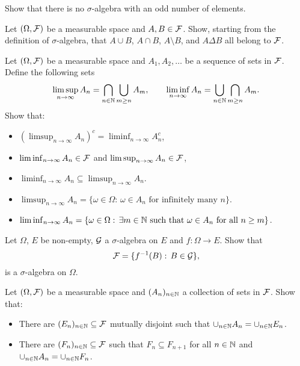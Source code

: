 
\begin{problem}
    Show that there is no $\sigma$-algebra with an odd number of elements.
\end{problem}

\begin{problem}
Let $(\Omega,\mathcal F)$ be a measurable space and $A,B\in \mathcal F$. Show, starting from the definition of $\sigma$-algebra, that $A\cup B$, $A\cap B$, $A\setminus B$, and $A\Delta B$ all belong to $\mathcal F$.
\end{problem}

\begin{problem}
    Let $(\Omega,\mathcal F)$ be a measurable space and $A_1, A_2,\ldots$ be a sequence of sets in $\mathcal F$. Define the following sets
    \begin{equation*}
        \limsup_{n\to\infty} A_n = \bigcap_{n\in \mathbb N} \bigcup_{m\geq n} A_m,\qquad \liminf_{n\to\infty} A_n = \bigcup_{n\in \mathbb N} \bigcap_{m\geq n} A_m.
    \end{equation*}
    Show that:
    \begin{itemize}
        \item $(\limsup_{n\to\infty} A_n)^c = \liminf_{n\to\infty} A_n^c$,
        \item $\liminf_{n\to\infty} A_n \in \mathcal F$ and $\limsup_{n\to\infty} A_n \in \mathcal F$,
        \item $\liminf_{n\to\infty} A_n \subseteq \limsup_{n\to\infty} A_n$.
        \item  $\limsup_{n\to\infty} A_n = \{\omega \in \Omega:\, \omega\in A_n\text{ for infinitely many $n$}\}$.
        \item $\liminf_{n\to\infty} A_n = \{\omega \in \Omega:\, \text{$\exists m\in \mathbb N$ such that $\omega\in A_n$ for all $n\geq m$}\}$.
    \end{itemize}
\end{problem}

\begin{problem}
    Let $\Omega$, $E$ be non-empty, $\mathcal G$ a $\sigma$-algebra on $E$ and $f:\Omega\to E$. Show that 
    \begin{equation*}
        \mathcal F = \{f^{-1}(B):\,B\in \mathcal G\},
    \end{equation*}
    is a $\sigma$-algebra on $\Omega$.
\end{problem}

\begin{problem}
    Let $(\Omega,\mathcal F)$ be a measurable space and $(A_n)_{n\in \mathbb N}$ a collection of sets in $\mathcal F$. Show that:
    \begin{itemize}
        \item There are $(E_n)_{n\in \mathbb N}\subseteq \mathcal F$ mutually disjoint such that $\cup_{n\in \mathbb N} A_n = \cup_{n\in \mathbb N} E_n$.
        \item There are $(F_n)_{n\in \mathbb N}\subseteq \mathcal F$ such that $F_n\subseteq F_{n+1}$ for all $n\in \mathbb N$ and $\cup_{n\in \mathbb N} A_n = \cup_{n\in \mathbb N} F_n$.
    \end{itemize} 
\end{problem}

